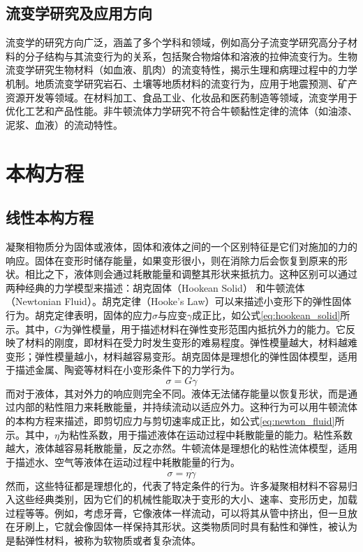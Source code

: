 \subsection{流变学研究及应用方向}
流变学的研究方向广泛，涵盖了多个学科和领域，例如高分子流变学研究高分子材料的分子结构与其流变行为的关系，包括聚合物熔体和溶液的拉伸流变行为\cite{lingComparisonReviewClassical2023}。生物流变学研究生物材料（如血液、肌肉）的流变特性，揭示生理和病理过程中的力学机制\cite{martin2023rheology,jeon2023review}。地质流变学研究岩石、土壤等地质材料的流变行为，应用于地震预测、矿产资源开发等领域\cite{campbellNewtonianPowerLaw2018}。在材料加工\cite{banerjeeRoleRheologyMorphology2023}、食品工业\cite{schreuders2022non}、化妆品和医药制造等领域\cite{kim2024role,murch2024non}，流变学用于优化工艺和产品性能\cite{zhangModificationTechnologiesConstitutive2024}。非牛顿流体力学研究不符合牛顿黏性定律的流体（如油漆、泥浆、血液）的流动特性\cite{sunReviewConstitutiveModels2024,wang2023non,lowe2019rheology}。

\section{本构方程}
\subsection{线性本构方程}
凝聚相物质分为固体或液体，固体和液体之间的一个区别特征是它们对施加的力的响应。固体在变形时储存能量，如果变形很小，则在消除力后会恢复到原来的形状。相比之下，液体则会通过耗散能量和调整其形状来抵抗力\cite{ricarteTutorialReviewLinear2024,yaoInelasticFluidModels2024}。这种区别可以通过两种经典的力学模型来描述：胡克固体（Hookean Solid） 和牛顿流体（Newtonian Fluid）。胡克定律（Hooke's Law）可以来描述小变形下的弹性固体行为。胡克定律表明，固体的应力$\sigma$与应变$\gamma$成正比，如公式\eqref{eq:hookean_solid}所示。其中，$G$为弹性模量，用于描述材料在弹性变形范围内抵抗外力的能力。它反映了材料的刚度，即材料在受力时发生变形的难易程度。弹性模量越大，材料越难变形；弹性模量越小，材料越容易变形。胡克固体是理想化的弹性固体模型，适用于描述金属、陶瓷等材料在小变形条件下的力学行为\cite{sunReviewConstitutiveModels2024}。
\begin{equation}
  \sigma = G \gamma  \label{eq:hookean_solid}
\end{equation}
而对于液体，其对外力的响应则完全不同。液体无法储存能量以恢复形状，而是通过内部的粘性阻力来耗散能量，并持续流动以适应外力。这种行为可以用牛顿流体的本构方程来描述，即剪切应力与剪切速率成正比，如公式\eqref{eq:newton_fluid}所示。其中，$\eta$为粘性系数，用于描述液体在运动过程中耗散能量的能力。粘性系数越大，液体越容易耗散能量，反之亦然。牛顿流体是理想化的粘性流体模型，适用于描述水、空气等液体在运动过程中耗散能量的行为\cite{ricarteTutorialReviewLinear2024}。
\begin{equation}
  \sigma = \eta \dot{\gamma}  \label{eq:newton_fluid}
\end{equation}
然而，这些特征都是理想化的，代表了特定条件的行为。许多凝聚相材料不容易归入这些经典类别，因为它们的机械性能取决于变形的大小、速率、变形历史，加载过程等等。例如，考虑牙膏，它像液体一样流动，可以将其从管中挤出，但一旦放在牙刷上，它就会像固体一样保持其形状。这类物质同时具有黏性和弹性，被认为是黏弹性材料，被称为软物质或者复杂流体\cite{songNonMaxwellianViscoelasticStress2023}。

